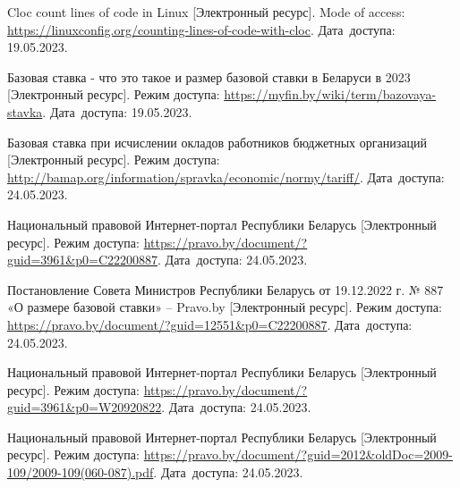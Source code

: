 \begin{thebibliography}{}
    Cloc count lines of code in Linux
    [Электронный ресурс].
    Mode of access: \url{https://linuxconfig.org/counting-lines-of-code-with-cloc}.
    Дата~доступа: 19.05.2023.

    Базовая ставка - что это такое и размер базовой ставки в Беларуси в 2023
    [Электронный ресурс].
    Режим доступа: \url{https://myfin.by/wiki/term/bazovaya-stavka}.
    Дата~доступа: 19.05.2023.

    Базовая ставка при исчислении окладов работников бюджетных организаций
    [Электронный ресурс].
    Режим доступа: \url{http://bamap.org/information/spravka/economic/normy/tariff/}.
    Дата~доступа: 24.05.2023.

    Национальный правовой Интернет-портал Республики Беларусь
    [Электронный ресурс].
    Режим доступа: \url{https://pravo.by/document/?guid=3961&p0=C22200887}.
    Дата~доступа: 24.05.2023.

    Постановление Совета Министров Республики Беларусь от 19.12.2022 г. № 887 «О размере базовой ставки» – Pravo.by
    [Электронный ресурс].
    Режим доступа: \url{https://pravo.by/document/?guid=12551&p0=C22200887}.
    Дата~доступа: 24.05.2023.

    Национальный правовой Интернет-портал Республики Беларусь
    [Электронный ресурс].
    Режим доступа: \url{https://pravo.by/document/?guid=3961&p0=W20920822}.
    Дата~доступа: 24.05.2023.

    Национальный правовой Интернет-портал Республики Беларусь
    [Электронный ресурс].
    Режим доступа: \url{https://pravo.by/document/?guid=2012&oldDoc=2009-109/2009-109(060-087).pdf}.
    Дата~доступа: 24.05.2023.



\end{thebibliography}
